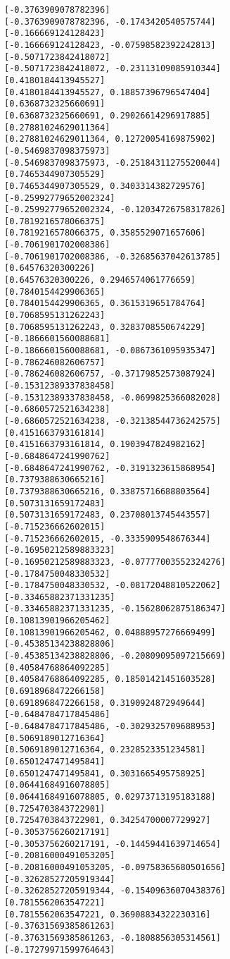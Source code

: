 \documentclass[11pt]{article}
\begin{document}
\begin{Verbatim}[commandchars=\\\{\}]
[-0.3763909078782396]
[-0.3763909078782396, -0.1743420540575744]
[-0.166669124128423]
[-0.166669124128423, -0.07598582392242813]
[-0.5071723842418072]
[-0.5071723842418072, -0.23113109085910344]
[0.4180184413945527]
[0.4180184413945527, 0.18857396796547404]
[0.6368732325660691]
[0.6368732325660691, 0.29026614296917885]
[0.27881024629011364]
[0.27881024629011364, 0.12720054169875902]
[-0.5469837098375973]
[-0.5469837098375973, -0.25184311275520044]
[0.7465344907305529]
[0.7465344907305529, 0.3403314382729576]
[-0.25992779652002324]
[-0.25992779652002324, -0.12034726758317826]
[0.7819216578066375]
[0.7819216578066375, 0.3585529071657606]
[-0.7061901702008386]
[-0.7061901702008386, -0.32685637042613785]
[0.64576320300226]
[0.64576320300226, 0.2946574061776659]
[0.7840154429906365]
[0.7840154429906365, 0.3615319651784764]
[0.7068595131262243]
[0.7068595131262243, 0.3283708550674229]
[-0.1866601560088681]
[-0.1866601560088681, -0.0867361095935347]
[-0.786246082606757]
[-0.786246082606757, -0.37179852573087924]
[-0.15312389337838458]
[-0.15312389337838458, -0.0699825366082028]
[-0.6860572521634238]
[-0.6860572521634238, -0.32138544736242575]
[0.4151663793161814]
[0.4151663793161814, 0.1903947824982162]
[-0.6848647241990762]
[-0.6848647241990762, -0.3191323615868954]
[0.7379388630665216]
[0.7379388630665216, 0.33875716688803564]
[0.5073131659172483]
[0.5073131659172483, 0.23708013745443557]
[-0.715236662602015]
[-0.715236662602015, -0.3335909548676344]
[-0.16950212589883323]
[-0.16950212589883323, -0.07777003552324276]
[-0.1784750048330532]
[-0.1784750048330532, -0.08172048810522062]
[-0.33465882371331235]
[-0.33465882371331235, -0.15628062875186347]
[0.10813901966205462]
[0.10813901966205462, 0.04888957276669499]
[-0.45385134238828806]
[-0.45385134238828806, -0.20809095097215669]
[0.40584768864092285]
[0.40584768864092285, 0.18501421451603528]
[0.6918968472266158]
[0.6918968472266158, 0.3190924872949644]
[-0.6484784717845486]
[-0.6484784717845486, -0.3029325709688953]
[0.5069189012716364]
[0.5069189012716364, 0.2328523351234581]
[0.6501247471495841]
[0.6501247471495841, 0.3031665495758925]
[0.06441684916078805]
[0.06441684916078805, 0.02973713195183188]
[0.7254703843722901]
[0.7254703843722901, 0.34254700007729927]
[-0.3053756260217191]
[-0.3053756260217191, -0.14459441639714654]
[-0.20816000491053205]
[-0.20816000491053205, -0.09758365680501656]
[-0.32628527205919344]
[-0.32628527205919344, -0.15409636070438376]
[0.7815562063547221]
[0.7815562063547221, 0.36908834322230316]
[-0.37631569385861263]
[-0.37631569385861263, -0.1808856305314561]
[-0.17279971599764643]

\end{Verbatim}
\end{document}
